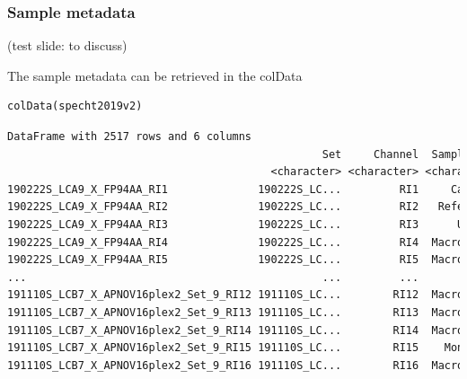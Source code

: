 \documentclass{beamer}
\newcommand{\hcode}[2][lgray]{{\ttfamily\color{vdgray}\colorbox{#1}{#2}}}
\newcommand{\frametitlesection}[1]{\frametitle{\centering #1 \footnotesize \hspace{0pt plus 1 filll} \insertsection}}
\begin{document}
\begin{frame}[fragile]
    \frametitlesection{Sample metadata}
    
    (test slide: to discuss)
    
    The sample metadata can be retrieved in the \hcode{colData}
    
    \begin{lstlisting}
colData(specht2019v2)
    \end{lstlisting}
    
    \begin{lstlisting}[language = TeX, numbers = none, basicstyle = \@setfontsize{\srcsize}{5pt}{5pt}\ttfamily\color{vdgray}]
DataFrame with 2517 rows and 6 columns
                                                 Set     Channel  SampleType     lcbatch     sortday      digest
                                         <character> <character> <character> <character> <character> <character>
190222S_LCA9_X_FP94AA_RI1              190222S_LC...         RI1     Carrier        LCA9          s8           N
190222S_LCA9_X_FP94AA_RI2              190222S_LC...         RI2   Reference        LCA9          s8           N
190222S_LCA9_X_FP94AA_RI3              190222S_LC...         RI3      Unused        LCA9          s8           N
190222S_LCA9_X_FP94AA_RI4              190222S_LC...         RI4  Macrophage        LCA9          s8           N
190222S_LCA9_X_FP94AA_RI5              190222S_LC...         RI5  Macrophage        LCA9          s8           N
...                                              ...         ...         ...         ...         ...         ...
191110S_LCB7_X_APNOV16plex2_Set_9_RI12 191110S_LC...        RI12  Macrophage        LCB7          s9           U
191110S_LCB7_X_APNOV16plex2_Set_9_RI13 191110S_LC...        RI13  Macrophage        LCB7          s9           U
191110S_LCB7_X_APNOV16plex2_Set_9_RI14 191110S_LC...        RI14  Macrophage        LCB7          s9           U
191110S_LCB7_X_APNOV16plex2_Set_9_RI15 191110S_LC...        RI15    Monocyte        LCB7          s9           U
191110S_LCB7_X_APNOV16plex2_Set_9_RI16 191110S_LC...        RI16  Macrophage        LCB7          s9           U    \end{lstlisting}
\end{frame}
\end{document}
